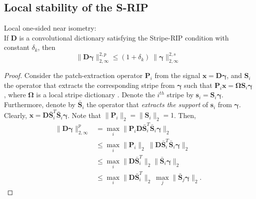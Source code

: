 \documentclass[10pt,journal]{IEEEtran}
\def\x{{\mathbf x}}
\def\D{{\mathbf D}}
\def\gama{{\boldsymbol \gamma}}
\def\O{{\boldsymbol \Omega}}
\theoremstyle{plain}
\theoremstyle{definition}
\begin{document}
\subsection{Local stability of the S-RIP}
\label{app:LocalStabilitySRIP}

\begin{customlemma}{2}{Local one-sided near isometry:} \label{lemma:LocalSRIP} \\
	If $\D$ is a convolutional dictionary satisfying the Stripe-RIP condition with constant $\delta_k$, then
	\begin{equation}
	\|\D\gama\|^{2,p}_{2,\infty} \leq (1+\delta_k)\ \|\gama\|^{2,s}_{2,\infty}
	\end{equation}
\end{customlemma}

\begin{proof} 
	Consider the patch-extraction operator $\mathbf{P}_i$ from the signal $\x = \D\gama$, and $\mathbf{S}_i$ the operator that extracts the corresponding stripe from $\gama$ such that $\mathbf{P}_i \x = \O \mathbf{S}_i \gama$, where $\O$ is a local stripe dictionary \cite{WorkingLocallyThinkingGlobally}. Denote the $i^{th}$ stripe by $\mathbf{s}_i = \mathbf{S}_i \gama$. Furthermore, denote by $\bar{\mathbf{S}}_i$ the operator that \emph{extracts the support} of $\mathbf{s}_i$ from $\gama$. Clearly, $ \x = \D \bar{\mathbf{S}}_i^T \bar{\mathbf{S}}_i \gama$. Note that $\| \mathbf{P}_i \|_2 = \|\mathbf{S}_i\|_2 = 1$.
	Then,
	\begin{align}
	\|\D\gama\|^p_{2,\infty}  & =  \underset{i}{\max} \|\mathbf{P}_i\D \bar{\mathbf{S}}_i^T \bar{\mathbf{S}}_i \gama\|_2 \\
	& \leq  \underset{i}{\max} \|\mathbf{P}_i\|_2 \ \| \D\bar{\mathbf{S}}^T_i \bar{\mathbf{S}}_i \gama\|_2 \\
	& \leq  \underset{i}{\max} \| \D\bar{\mathbf{S}}_i^T \|_2 \| \bar{\mathbf{S}}_i \gama\|_2 \\
	& \leq  \underset{i}{\max} \| \D\bar{\mathbf{S}}_i^T \|_2 \ \underset{j}{\max} \| \bar{\mathbf{S}}_j \gama\|_2.
	\end{align}
	

\end{proof}
\end{document}
